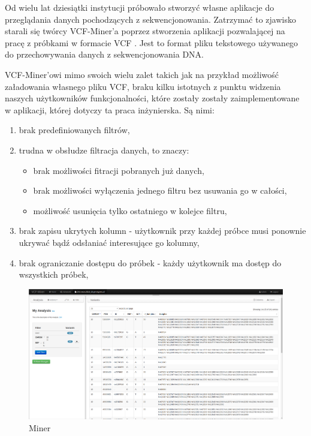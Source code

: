 \documentclass[a4paper,12pt,twoside]{article}
\begin{document}
Od wielu lat dziesiątki instytucji próbowało stworzyć własne aplikacje do przeglądania danych pochodzących z sekwencjonowania. Zatrzymać to zjawisko
starali się twórcy VCF-Miner'a \cite{miner} \cite{minerArt} poprzez 
stworzenia aplikacji pozwalającej na pracę z próbkami w formacie VCF \cite{vcfformat}. Jest to format pliku tekstowego używanego do przechowywania
danych z sekwencjonowania DNA. 

VCF-Miner'owi mimo swoich wielu zalet takich jak na przykład możliwość
załadowania własnego pliku VCF, braku kilku istotnych z 
punktu widzenia naszych użytkowników funkcjonalności, które zostały 
zostały zaimplementowane w aplikacji, której dotyczy ta praca inżynierska.
Są nimi:
\begin{enumerate}[1)]
\item brak predefiniowanych filtrów, 
\item trudna w obsłudze filtracja danych, to znaczy: 
\begin{itemize}
\item brak możliwości fitracji pobranych już danych,   
\item brak możliwości wyłączenia jednego filtru bez usuwania go w całości,
\item możliwość usunięcia tylko ostatniego w kolejce filtru,
\end{itemize}
\item brak zapisu ukrytych kolumn - użytkownik przy każdej próbce
musi ponownie ukrywać bądź odsłaniać interesujące go kolumny,
\item brak ograniczanie dostępu do próbek - każdy użytkownik ma dostęp
do wszystkich próbek,
\end{enumerate}

\begin{figure}[h]
\includegraphics[width=\linewidth]{obrazy/exac/miner.png}
  \caption{Miner}
  \label{fig:minerpic}
\end{figure}
\end{document}
